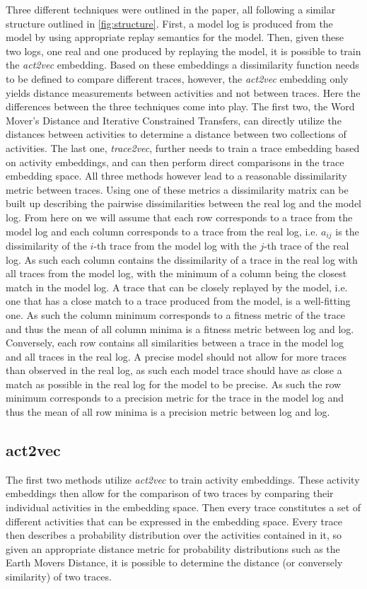 \documentclass[runningheads]{template/llncs}
\begin{document}
\color{blue}
Three different techniques were outlined in the paper, all following a similar structure outlined in \cref{fig:structure}.
First, a model log is produced from the model by using appropriate replay semantics for the model.
Then, given these two logs, one real and one produced by replaying the model, it is possible to train the \emph{act2vec}\cite{KBWe18} embedding.
Based on these embeddings a dissimilarity function needs to be defined to compare different traces, however, the \emph{act2vec} embedding only yields distance measurements between activities and not between traces.
Here the differences between the three techniques come into play.
The first two, the Word Mover's Distance \cite{KSKW15} and Iterative Constrained Transfers, can directly utilize the distances between activities to determine a distance between two collections of activities.
The last one, \emph{trace2vec}, further needs to train a trace embedding based on activity embeddings, and can then perform direct comparisons in the trace embedding space.
All three methods however lead to a reasonable dissimilarity metric between traces.
Using one of these metrics a dissimilarity matrix can be built up describing the pairwise dissimilarities between the real log and the model log.
\color{black}
From here on we will assume that each row corresponds to a trace from the model log and each column corresponds to a trace from the real log, i.e. $a_{ij}$ is the dissimilarity of the $i$-th trace from the model log with the $j$-th trace of the real log.
As such each column contains the dissimilarity of a trace in the real log with all traces from the model log, with the minimum of a column being the closest match in the model log.
A trace that can be closely replayed by the model, i.e. one that has a close match to a trace produced from the model, is a well-fitting one.
As such the column minimum corresponds to a fitness metric of the trace and thus the mean of all column minima is a fitness metric between log and log.
Conversely, each row contains all similarities between a trace in the model log and all traces in the real log.
A precise model should not allow for more traces than observed in the real log, as such each model trace should have as close a match as possible in the real log for the model to be precise.
As such the row minimum corresponds to a precision metric for the trace in the model log and thus the mean of all row minima is a precision metric between log and log.

\subsection{act2vec}
The first two methods utilize \emph{act2vec} to train activity embeddings.
These activity embeddings then allow for the comparison of two traces by comparing their individual activities in the embedding space.
Then every trace constitutes a set of different activities that can be expressed in the embedding space.
Every trace then describes a probability distribution over the activities contained in it, so given an appropriate distance metric for probability distributions such as the Earth Movers Distance, it is possible to determine the distance (or conversely similarity) of two traces.
\end{document}
